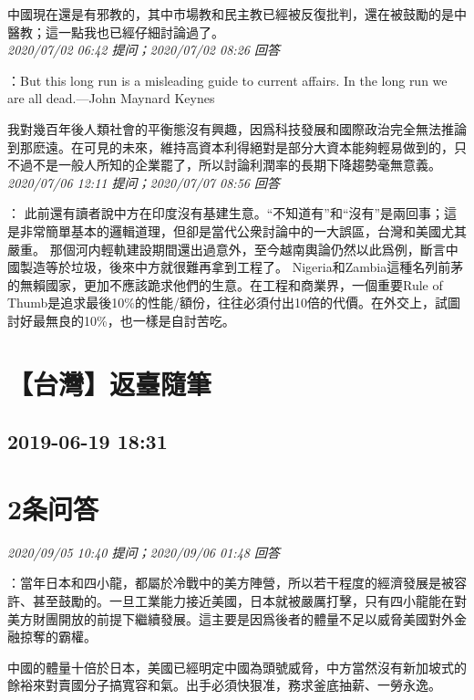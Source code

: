 \documentclass[twocolumn]{ctexart}
\begin{document}
中國現在還是有邪教的，其中市場教和民主教已經被反復批判，還在被鼓勵的是中醫教；這一點我也已經仔細討論過了。
\\

\textit{\hfill\noindent\small 2020/07/02 06:42 提问；2020/07/02 08:26 回答}

：But this long run is a misleading guide to current affairs. In the long run we are all dead.---John Maynard Keynes

我對幾百年後人類社會的平衡態沒有興趣，因爲科技發展和國際政治完全無法推論到那麽遠。在可見的未來，維持高資本利得絕對是部分大資本能夠輕易做到的，只不過不是一般人所知的企業罷了，所以討論利潤率的長期下降趨勢毫無意義。
\\

\textit{\hfill\noindent\small 2020/07/06 12:11 提问；2020/07/07 08:56 回答}

：
此前還有讀者說中方在印度沒有基建生意。“不知道有”和“沒有”是兩回事；這是非常簡單基本的邏輯道理，但卻是當代公衆討論中的一大誤區，台灣和美國尤其嚴重。
那個河内輕軌建設期間還出過意外，至今越南輿論仍然以此爲例，斷言中國製造等於垃圾，後來中方就很難再拿到工程了。
Nigeria和Zambia這種名列前茅的無賴國家，更加不應該跪求他們的生意。在工程和商業界，一個重要Rule of Thumb是追求最後10\%的性能/額份，往往必須付出10倍的代價。在外交上，試圖討好最無良的10\%，也一樣是自討苦吃。
\\


\section{【台灣】返臺隨筆}
\subsection{2019-06-19 18:31}


\section{2条问答}

\textit{\hfill\noindent\small 2020/09/05 10:40 提问；2020/09/06 01:48 回答}

：當年日本和四小龍，都屬於冷戰中的美方陣營，所以若干程度的經濟發展是被容許、甚至鼓勵的。一旦工業能力接近美國，日本就被嚴厲打擊，只有四小龍能在對美方財團開放的前提下繼續發展。這主要是因爲後者的體量不足以威脅美國對外金融掠奪的霸權。

中國的體量十倍於日本，美國已經明定中國為頭號威脅，中方當然沒有新加坡式的餘裕來對賣國分子搞寬容和氣。出手必須快狠准，務求釜底抽薪、一勞永逸。
\\
\end{document}

